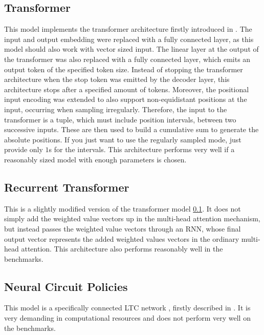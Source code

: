 \documentclass[draft,final]{vutinfth} %
\begin{document}
    \subsection{Transformer} \label{Transformer}
    This model implements the transformer architecture firstly introduced in \cite{Transformer}. The input and output embedding were replaced with a fully connected layer, as this model should also work with vector sized input.
    The linear layer at the output of the transformer was also replaced with a fully connected layer, which emits an output token of the specified token size.
    Instead of stopping the transformer architecture when the stop token was emitted by the decoder layer, this architecture stops after a specified amount of tokens.
    Moreover, the positional input encoding was extended to also support non-equidistant positions at the input, occurring when sampling irregularly.
    Therefore, the input to the transformer is a tuple, which must include position intervals, between two successive inputs.
    These are then used to build a cumulative sum to generate the absolute positions. If you just want to use the regularly sampled mode, just provide only $1$s for the intervals.
    This architecture performs very well if a reasonably sized model with enough parameters is chosen.

    \subsection{Recurrent Transformer} \label{Recurrent Transformer}
    This is a slightly modified version of the transformer model \ref{Transformer}.
    It does not simply add the weighted value vectors up in the multi-head attention mechanism, but instead passes the weighted value vectors through an RNN, whose final output vector represents the added weighted values vectors in the ordinary multi-head attention.
    This architecture also performs reasonably well in the benchmarks.

    \subsection{Neural Circuit Policies} \label{Neural Circuit Policies}
    This model is a specifically connected LTC network \cite{LTCNetworks}, firstly described in \cite{NCP}.
    It is very demanding in computational resources and does not perform very well on the benchmarks.
\end{document}
